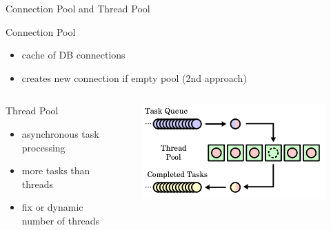 \documentclass{beamer}
\begin{document}
\begin{frame}{Connection Pool and Thread Pool}
\vspace{-0.25cm}
\begin{block}{Connection Pool}
  \begin{itemize}
    \item cache of DB connections
    \item creates new connection if empty pool (2nd approach)
  \end{itemize}
\end{block}

\vspace{-0.25cm}
\pause

\begin{columns}
  \begin{column}{.47\textwidth}
    \begin{block}{Thread Pool}
      \begin{itemize}
        \item asynchronous task processing
        \item more tasks than threads
        \item fix or dynamic number of threads
      \end{itemize}
    \end{block}
  \end{column}

  \begin{column}{.47\textwidth}
    \begin{figure}[t]
      \includegraphics[width=\textwidth]{500px-Thread_pool.png}
    \end{figure}
  \end{column}
\end{columns}

\end{frame}
\end{document}
